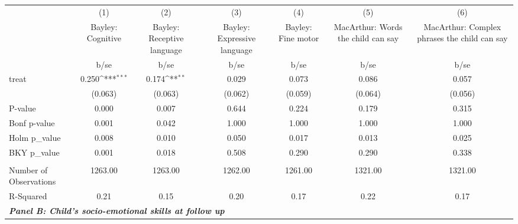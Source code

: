{
\def\sym#1{\ifmmode^{#1}\else\(^{#1}\)\fi}
\begin{tabular}{l*{6}{c}}
\hline\hline
&\multicolumn{1}{c}{(1)}&\multicolumn{1}{c}{(2)}&\multicolumn{1}{c}{(3)}&\multicolumn{1}{c}{(4)}&\multicolumn{1}{c}{(5)}&\multicolumn{1}{c}{(6)}\\
&\multicolumn{1}{c}{Bayley: Cognitive}&\multicolumn{1}{c}{Bayley: Receptive language}&\multicolumn{1}{c}{Bayley: Expressive language}&\multicolumn{1}{c}{Bayley: Fine motor}&\multicolumn{1}{c}{MacArthur: Words the child can say}&\multicolumn{1}{c}{MacArthur: Complex phrases the child can say}\\
&        b/se         &        b/se         &        b/se         &        b/se         &        b/se         &        b/se         \\
\hline
treat               &       0.250\sym{***}&       0.174\sym{**} &       0.029         &       0.073         &       0.086         &       0.057         \\
&     (0.063)         &     (0.063)         &     (0.062)         &     (0.059)         &     (0.064)         &     (0.056)         \\
\hline
P-value             &       0.000         &       0.007         &       0.644         &       0.224         &       0.179         &       0.315         \\
Bonf p-value        &       0.001         &       0.042         &       1.000         &       1.000         &       1.000         &       1.000         \\
Holm p\_value        &       0.008         &       0.010         &       0.050         &       0.017         &       0.013         &       0.025         \\
BKY p\_value         &       0.001         &       0.018         &       0.508         &       0.290         &       0.290         &       0.338         \\
&                     &                     &                     &                     &                     &                     \\
Number of Observations&     1263.00         &     1263.00         &     1262.00         &     1261.00         &     1321.00         &     1321.00         \\
R-Squared           &        0.21         &        0.15         &        0.20         &        0.17         &        0.22         &        0.17         \\
\hline
\multicolumn{6}{l}{\linebreak \textbf{\textit{Panel B: Child's socio-emotional skills at follow up}}} \\

\end{tabular}}
